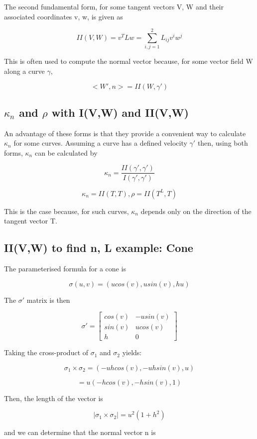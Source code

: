 \documentclass{article}
\begin{document}
The second fundamental form, for some tangent vectors V, W and their associated coordinates v, w, is given as

\[ II(V,W) = v^T L w = \sum_{i,j=1}^{2} L_{ij}v^i w^j\]

This is often used to compute the normal vector because, for some vector field W along a curve $\gamma$,

\[ <W', n> = II(W, \gamma') \]

\subsection{$\kappa_{n}$ and $\rho$ with I(V,W) and II(V,W) }

An advantage of these forms is that they provide a convenient way to calculate $\kappa_{n}$ for some curves. Assuming a curve has a defined velocity $\gamma'$ then, using both forms, $\kappa_{n}$ can be calculated by

\[ \kappa_{n} = \frac{II(\gamma',\gamma')}{I(\gamma',\gamma')} \]

\[ \kappa_{n} = II(T, T), \rho = II(T^L, T)\]

This is the case because, for such curves, $\kappa_{n}$ depends only on the direction of the tangent vector T.

\subsection{II(V,W) to find n, L example: Cone}

The parameterised formula for a cone is

\[ \sigma(u,v) = (ucos(v), usin(v), hu) \]

The $\sigma'$ matrix is then

 \[
  \sigma' =
  \begin{bmatrix}
cos(v) & -usin(v)\\
sin(v) & ucos(v)\\
h & 0
\end{bmatrix}
 \]
 
 Taking the cross-product of $\sigma_{1}$ and $\sigma_{2}$ yields:
 
 \[ \sigma_{1} \times \sigma_{2} = (-uhcos(v), -uhsin(v), u) \]
 
 \[ = u(-hcos(v), -hsin(v), 1) \]
 
 Then, the length of the vector is
 
\[ |\sigma_{1} \times \sigma_{2}| = u^2 (1+h^2) \]

and we can determine that the normal vector n is
\end{document}
